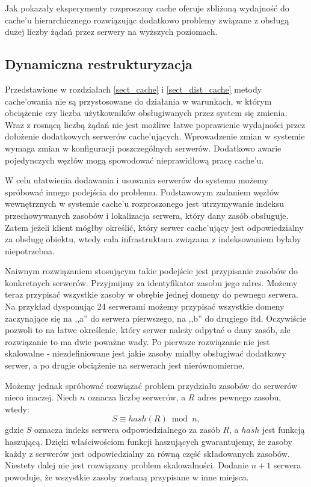 \documentclass[a4paper,11pt]{scrartcl}
\newcommand{\s}{ }
\newcommand{\kesz}{cache}
\newcommand{\keszu}{cache'u}
\newcommand{\keszujacy}{cache'ujący}
\newcommand{\keszujacych}{cache'ujących}
\newcommand{\keszowania}{cache'owania}
\begin{document}
Jak pokazały eksperymenty \cite{povey1997distributed} rozproszony \kesz\s oferuje zbliżoną wydajność do \keszu\s hierarchicznego rozwiązując dodatkowo problemy związane z obsługą dużej liczby żądań przez serwery na wyższych poziomach.

\subsection{Dynamiczna restrukturyzacja}
Przedstawione w rozdziałach \ref{sect_cache} i \ref{sect_dist_cache} metody \keszowania\s nie są przystosowane do działania w warunkach, w którym obciążenie czy liczba użytkowników obsługiwanych przez system się zmienia. Wraz z rosnącą liczbą żądań nie jest możliwe łatwe poprawienie wydajności przez dołożenie dodatkowych serwerów \keszujacych. Wprowadzenie zmian w systemie wymaga zmian w konfiguracji poszczególnych serwerów. Dodatkowo awarie pojedynczych węzłów mogą spowodować nieprawidłową pracę \keszu.

W celu ułatwienia dodawania i usuwania serwerów do systemu możemy spróbować innego podejścia do problemu. Podstawowym zadaniem węzłów wewnętrznych w systemie \keszu\s rozproszonego jest utrzymywanie indeksu przechowywanych zasobów i lokalizacja serwera, który dany zasób obsługuje. Zatem jeżeli klient mógłby określić, który serwer \keszujacy\s jest odpowiedzialny za obsługę obiektu, wtedy cała infrastruktura związana z indeksowaniem byłaby niepotrzebna.

Naiwnym rozwiązaniem stosującym takie podejście jest przypisanie zasobów do konkretnych serwerów. Przyjmijmy za identyfikator zasobu jego adres. Możemy teraz przypisać wszystkie zasoby w obrębie jednej domeny do pewnego serwera. Na przykład dysponując 24 serwerami możemy przypisać wszystkie domeny zaczynające się na ,,a'' do serwera pierwszego, na ,,b'' do drugiego itd. Oczywiście pozwoli to na łatwe określenie, który serwer należy odpytać o dany zasób, ale rozwiązanie to ma dwie poważne wady. Po pierwsze rozwiązanie nie jest skalowalne - niezdefiniowane jest jakie zasoby miałby obsługiwać dodatkowy serwer, a po drugie obciążenie na serwerach jest nierównomierne.

Możemy jednak spróbować rozwiązać problem przydziału zasobów do serwerów nieco inaczej. Niech $n$ oznacza liczbę serwerów, a $R$ adres pewnego zasobu, wtedy:
\begin{equation*}
S \equiv hash(R) \bmod n,
\end{equation*}
 gdzie $S$ oznacza indeks serwera odpowiedzialnego za zasób $R$, a $hash$ jest funkcją haszującą. Dzięki właściwościom funkcji haszujących gwarantujemy, że zasoby każdy z serwerów jest odpowiedzialny za równą część składowanych zasobów. Niestety dalej nie jest rozwiązany problem skalowalności. Dodanie $n+1$ serwera powoduje, że wszystkie zasoby zostaną przypisane w inne miejsca.
 
\end{document}
